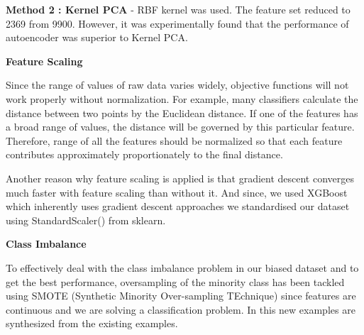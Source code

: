 \documentclass[11pt,a4paper]{article}
\begin{document}
\medskip

\textbf{Method 2 : Kernel PCA} - RBF kernel was used. The feature set reduced to 2369 from 9900. However, it was experimentally found that the performance of autoencoder was superior to Kernel PCA.

\medskip


\begin{center}
\textbf{Feature Scaling} 
\end{center}
Since the range of values of raw data varies widely, objective functions will not work properly without normalization. For example, many classifiers calculate the distance between two points by the Euclidean distance. If one of the features has a broad range of values, the distance will be governed by this particular feature. Therefore, range of all the features should be normalized so that each feature contributes approximately proportionately to the final distance.

Another reason why feature scaling is applied is that gradient descent converges much faster with feature scaling than without it. And since, we used XGBoost which inherently uses gradient descent approaches we standardised our dataset using StandardScaler() from sklearn.

\medskip

\begin{center}
\textbf{Class Imbalance }
\end{center}
To effectively deal with the class imbalance problem in our biased dataset and to get the best performance, oversampling of the minority class has been tackled using SMOTE (Synthetic Minority Over-sampling TEchnique)\cite{SMOTE} since features are continuous and we are solving a classification problem. In this new examples are synthesized from the existing examples. 
\end{document}
